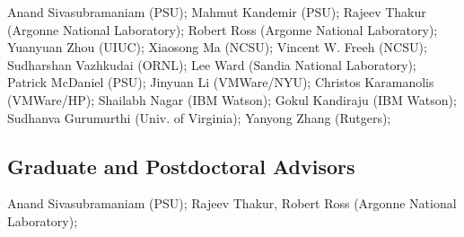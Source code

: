 \documentclass[11pt,fullpage]{article}
\begin{document}
{Anand Sivasubramaniam (PSU);
Mahmut Kandemir (PSU);
Rajeev Thakur (Argonne National Laboratory);
Robert Ross (Argonne National Laboratory);
Yuanyuan Zhou (UIUC);
Xiaosong Ma (NCSU);
Vincent W. Freeh (NCSU);
Sudharshan Vazhkudai (ORNL);
Lee Ward (Sandia National Laboratory);
Patrick McDaniel (PSU);
Jinyuan Li (VMWare/NYU);
Christos Karamanolis (VMWare/HP);
Shailabh Nagar (IBM Watson);
Gokul Kandiraju (IBM Watson);
Sudhanva Gurumurthi (Univ. of Virginia);
Yanyong Zhang (Rutgers);

\vspace*{-2mm}
\subsection*{Graduate and Postdoctoral Advisors}

Anand Sivasubramaniam (PSU);
Rajeev Thakur, Robert Ross (Argonne National Laboratory);



}
\end{document}
